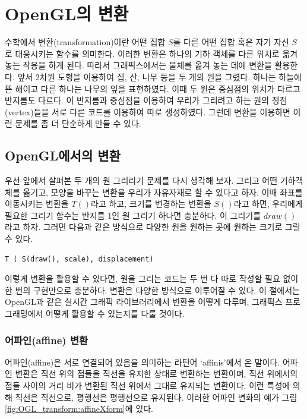 \renewcommand\chapterillustration{OGL_transform/chapterImage}



\chapter{OpenGL의 변환}


수학에서 변환(transformation)이란 어떤 집합 $S$를 다른 어떤 집합 혹은 자기 자신 $S$로 대응시키는 함수를 의미한다. 이러한 변환은 하나의 기하 객체를 다른 위치로 옮겨 놓는 작용을 하게 된다. 따라서 그래픽스에서는 물체를 옮겨 놓는 데에 변환을 활용한다. 앞서 2차원 도형을 이용하여 집, 산, 나무 등을 두 개의 원을 그렸다.
하나는 하늘에 뜬 해이고 다른 하나는 나무의 잎을 표현하였다.
이때 두 원은 중심점의 위치가 다르고 반지름도 다르다. 이 반지름과 중심점을 이용하여
우리가 그리려고 하는 원의 정점(vertex)들을 서로 다른 코드를 이용하여 따로 생성하였다.
그런데 변환을 이용하면 이런 문제를 좀 더 단순하게 만들 수 있다. 


\section{OpenGL에서의 변환}

우선 앞에서 살펴본 두 개의 원 그리리기 문제를 다시 생각해 보자.
그리고 어떤 기하객체를 옮기고, 모양을 바꾸는 변환을 우리가 자유자재로 할 수 있다고 하자.
이때 좌표를 이동시키는 변환을 $T()$라고 하고, 
크기를 변경하는 변환을 $S()$라고 하면, 우리에게 필요한 그리기 함수는 반지름 1인 원 그리기 하나면 충분하다.
이 그리기를 $draw()$라고 하자. 그러면 다음과 같은 방식으로 다양한 원을 원하는 곳에 원하는 크기로 그릴 수 있다.

\begin{verbatim}
T ( S(draw(), scale), displacement)
\end{verbatim}

이렇게 변환을 활용할 수 있다면, 원을 그리는 코드는 두 번 다 따로 작성할 필요 없이 한 번의 구현만으로 충분하다.
변환은 다양한 방식으로 이루어질 수 있다. 이 절에서는 OpenGL과 같은 실시간 그래픽 라이브러리에서 변환을 어떻게 다루며, 
그래픽스 프로그래밍에서 어떻게 활용할 수 있는지를 다룰 것이다.

\subsection{어파인(affine) 변환}
어파인(affine)은 서로 연결되어 있음을 의미하는 라틴어 `affinis'에서 온 말이다. 어파인 변환은 직선 위의 점들을 직선을 유지한 상태로 변환하는 변환이며, 직선 위에서의 점들 사이의 거리 비가 변환된 직선 위에서 그대로 유지되는 변환이다. 이런 특성에 의해 직선은 직선으로, 평행선은 평행선으로 유지된다. 이러한 어파인 변화의 예가 그림 \ref{fig:OGL_transform:affineXform}에 있다.

